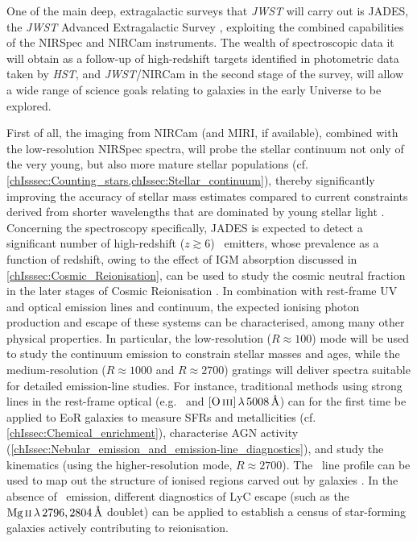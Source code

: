 One of the main deep, extragalactic surveys that \textit{JWST} will carry out is JADES, the \textit{JWST} Advanced Extragalactic Survey \citep[e.g.][]{2018ApJS..236...33W}, exploiting the combined capabilities of the NIRSpec and NIRCam instruments. The wealth of spectroscopic data it will obtain as a follow-up of high-redshift targets identified in photometric data taken by \textit{HST}, and \textit{JWST}/NIRCam in the second stage of the survey, will allow a wide range of science goals relating to galaxies in the early Universe to be explored.

First of all, the imaging from NIRCam (and MIRI, if available), combined with the low-resolution NIRSpec spectra, will probe the stellar continuum not only of the very young, but also more mature stellar populations (cf. \cref{chIsssec:Counting_stars,chIssec:Stellar_continuum}), thereby significantly improving the accuracy of stellar mass estimates compared to current constraints derived from shorter wavelengths that are dominated by young stellar light \citep[e.g.][]{2022arXiv220803281T}. Concerning the spectroscopy specifically, JADES is expected to detect a significant number of high-redshift ($z \gtrsim 6$) \lya\ emitters, whose prevalence as a function of redshift, owing to the effect of IGM absorption discussed in \cref{chIsssec:Cosmic_Reionisation}, can be used to study the cosmic neutral fraction in the later stages of Cosmic Reionisation \citep{2010MNRAS.408.1628S, 2014ApJ...793..113P, 2014MNRAS.443.2831C, 2018ApJ...856....2M, 2019MNRAS.489.2669M, 2022MNRAS.512.5960M}. In combination with rest-frame UV and optical emission lines and continuum, the expected ionising photon production and escape of these systems can be characterised, among many other physical properties. In particular, the low-resolution ($R \approx 100$) mode will be used to study the continuum emission to constrain stellar masses and ages, while the medium-resolution ($R \approx 1000$ and $R \approx 2700$) gratings will deliver spectra suitable for detailed emission-line studies. For instance, traditional methods using strong lines in the rest-frame optical (e.g. \Halpha\ and $\OIIIf \, \lambda \, 5008 \, \Angstrom$) can for the first time be applied to EoR galaxies to measure SFRs and metallicities (cf. \cref{chIssec:Chemical_enrichment}), characterise AGN activity (\cref{chIssec:Nebular_emission_and_emission-line_diagnostics}), and study the kinematics (using the higher-resolution mode, $R \approx 2700$). The \lya\ line profile can be used to map out the structure of ionised regions carved out by galaxies \citep[``ionised bubbles'';][]{2020MNRAS.499.1395M}. In the absence of \lya\ emission, different diagnostics of LyC escape (such as the $\MgII \, \lambda \, 2796, 2804 \, \Angstrom$ doublet) can be applied to establish a census of star-forming galaxies actively contributing to reionisation.

